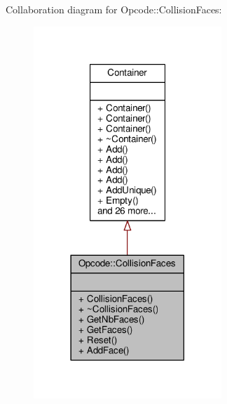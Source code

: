 Collaboration diagram for Opcode\+:\+:Collision\+Faces\+:
\nopagebreak
\begin{figure}[H]
\begin{center}
\leavevmode
\includegraphics[width=201pt]{d2/d4e/classOpcode_1_1CollisionFaces__coll__graph}
\end{center}
\end{figure}
